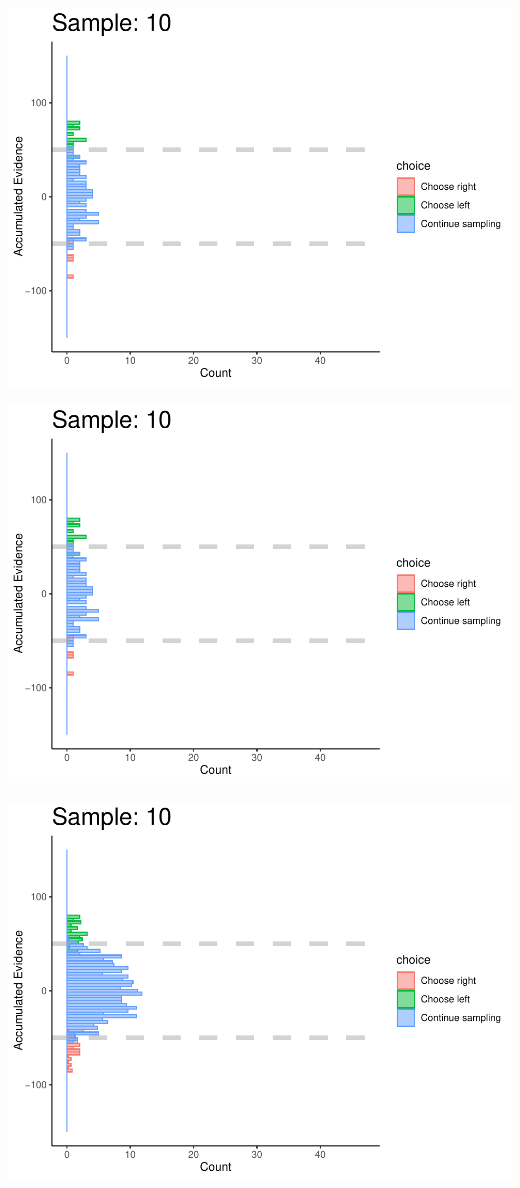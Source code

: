 \documentclass[
]{book}
\begin{document}
\begin{center}\includegraphics[width=0.8\linewidth]{LateNightBayes_files/figure-latex/fixed_check-94} \end{center}

\begin{center}\includegraphics[width=0.8\linewidth]{LateNightBayes_files/figure-latex/fixed_check-95} \end{center}

\begin{center}\includegraphics[width=0.8\linewidth]{LateNightBayes_files/figure-latex/fixed_check-96} \end{center}
\end{document}
